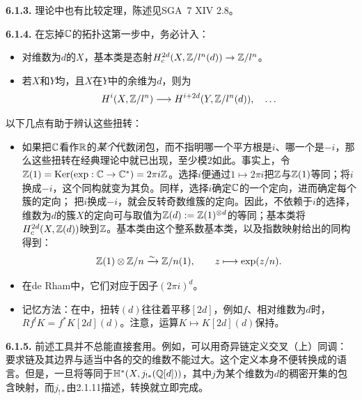 \par\medskip\noindent\textbf{6.1.3.} 理论中也有比较定理，陈述见SGA~7 XIV 2.8。

\par\medskip\noindent\textbf{6.1.4.} 在忘掉$\mathbb C$的拓扑这第一步中，务必计入：
\begin{itemize}
\item 对维数为$d$的$X$，基本类是态射$H_c^{2d}(X,\mathbb Z/l^n(d))\to\mathbb Z/l^n$。
\item 若$X$和$Y$均，且$X$在$Y$中的余维为$d$，则为
\[
H^i(X,\mathbb Z/l^n)\longrightarrow H^{i+2d}(Y,\mathbb Z/l^n(d)),\quad\ldots
\]
\end{itemize}
以下几点有助于辨认这些扭转：
\begin{itemize}
\item 如果把$\mathbb C$看作$\mathbb R$的\emph{某个}代数闭包，而不指明哪一个平方根是$i$、哪一个是$-i$，那么这些扭转在经典理论中就已出现，至少模$2$如此。事实上，令$\mathbb Z(1)=\operatorname{Ker}(\exp:\mathbb C\to\mathbb C^*)=2\pi i\mathbb Z$。选择$i$便通过$1\mapsto2\pi i$把$\mathbb Z$与$\mathbb Z(1)$等同；将$i$换成$-i$，这个同构就变为其负。同样，选择$i$确定$\mathbb C$的一个定向，进而确定每个簇的定向；
把$i$换成$-i$，就会反转奇数维簇的定向。因此，不依赖于$i$的选择，维数为$d$的簇$X$的定向可与取值为$\mathbb Z(d):=\mathbb Z(1)^{\otimes d}$的等同；基本类将$H_c^{2d}(X,\mathbb Z(d))$映到$\mathbb Z$。基本类由这个整系数基本类，以及指数映射给出的同构得到：
\[
\mathbb Z(1)\otimes\mathbb Z/n\xrightarrow{\sim}\mathbb Z/n(1),\qquad z\longmapsto\exp(z/n).
\]
\item 在de Rham中，它们对应于因子$(2\pi i)^d$。
\item 记忆方法：在中，扭转$(d)$往往着平移$[2d]$，例如$f$、相对维数为$d$时，$Rf^!K=f^*K[2d](d)$。注意，运算$K\mapsto K[2d](d)$保持。
\end{itemize}

\par\medskip\noindent\textbf{6.1.5.} 前述工具并不总能直接套用。例如，可以用奇异链定义交叉（上）同调：要求链及其边界与适当中各的交的维数不能过大。这个定义本身不便转换成的语言。但是，一旦将等同于$\mathbb H^*(X,j_{!*}(\mathbb Q[d]))$，其中$j$为某个维数为$d$的稠密开集的包含映射，而$j_{!*}$由2.1.11描述，转换就立即完成。

